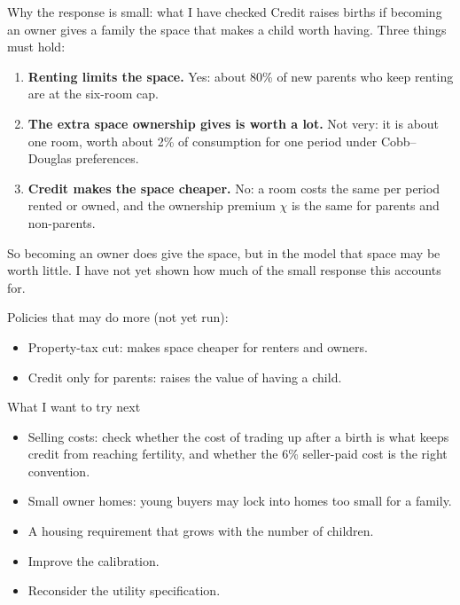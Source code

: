\documentclass[11pt,aspectratio=169]{beamer}
\begin{document}
\begin{frame}{Why the response is small: what I have checked}
\small
Credit raises births if becoming an owner gives a family the space that makes a child worth having. Three things must hold:
\begin{enumerate}\setlength\itemsep{2pt}
 \item \textbf{Renting limits the space.} Yes: about 80\% of new parents who keep renting are at the six-room cap.
 \item \textbf{The extra space ownership gives is worth a lot.} Not very: it is about one room, worth about 2\% of consumption for one period under Cobb--Douglas preferences.
 \item \textbf{Credit makes the space cheaper.} No: a room costs the same per period rented or owned, and the ownership premium $\chi$ is the same for parents and non-parents.
\end{enumerate}
\smallskip
So becoming an owner does give the space, but in the model that space may be worth little. I have not yet shown how much of the small response this accounts for.
\par\smallskip
Policies that may do more (not yet run):
\begin{itemize}\setlength\itemsep{1pt}
 \item Property-tax cut: makes space cheaper for renters and owners.
 \item Credit only for parents: raises the value of having a child.
\end{itemize}
\end{frame}

\begin{frame}{What I want to try next}
\small
\begin{itemize}\setlength\itemsep{7pt}
 \item Selling costs: check whether the cost of trading up after a birth is what keeps credit from reaching fertility, and whether the 6\% seller-paid cost is the right convention.
 \item Small owner homes: young buyers may lock into homes too small for a family.
 \item A housing requirement that grows with the number of children.
 \item Improve the calibration.
 \item Reconsider the utility specification.
\end{itemize}
\end{frame}
\end{document}

